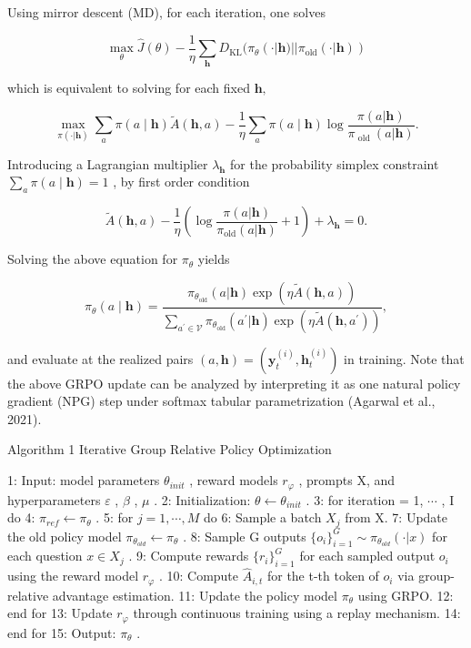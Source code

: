 \documentclass[
  10
]{article}
\begin{document}
Using mirror descent (MD), for each iteration, one solves

\[
\max _ {\theta} \hat {J} (\theta) - \frac {1}{\eta} \sum_ {\mathbf {h}} D _ {\mathrm{KL}} (\pi_ {\theta} (\cdot | \mathbf {h}) | | \pi_ {\mathrm{old}} (\cdot | \mathbf {h}))
\]

which is equivalent to solving for each fixed \(\mathbf { h } ,\)

\[
\max _ {\pi (\cdot | \mathbf {h})} \sum_ {a} \pi (a \mid \mathbf {h}) \tilde {A} (\mathbf {h}, a) - \frac {1}{\eta} \sum_ {a} \pi (a \mid \mathbf {h}) \log \frac {\pi (a | \mathbf {h})}{\pi_ {\text { old }} (a | \mathbf {h})}.
\]

Introducing a Lagrangian multiplier \(\lambda _ { \mathbf { h } }\) for
the probability simplex constraint
\(\scriptstyle \sum _ { a } \pi ( a \mid \mathbf { h } ) = 1\) , by
first order condition

\[
\tilde {A} (\mathbf {h}, a) - \frac {1}{\eta} \left(\log \frac {\pi (a | \mathbf {h})}{\pi_ {\mathrm{old}} (a | \mathbf {h})} + 1\right) + \lambda_ {\mathbf {h}} = 0.
\]

Solving the above equation for \(\pi _ { \theta }\) yields

\[
\pi_ {\theta} (a \mid \mathbf {h}) = \frac {\pi_ {\theta_ {\mathrm{old}}} (a | \mathbf {h}) \exp (\eta \tilde {A} (\mathbf {h} , a))}{\sum_ {a ^ {\prime} \in \mathcal {V}} \pi_ {\theta_ {\mathrm{old}}} (a ^ {\prime} | \mathbf {h}) \exp (\eta \tilde {A} (\mathbf {h} , a ^ {\prime}))},
\]

and evaluate at the realized pairs
\(( a , \mathbf { h } ) = ( \mathbf { y } _ { t } ^ { ( i ) } , \mathbf { h } _ { t } ^ { ( i ) } )\)
in training. Note that the above GRPO update can be analyzed by
interpreting it as one natural policy gradient (NPG) step under softmax
tabular parametrization (Agarwal et al., 2021).

Algorithm 1 Iterative Group Relative Policy Optimization

1: Input: model parameters \(\theta_{init}\) , reward models
\(r_{\varphi}\) , prompts X, and hyperparameters \(\varepsilon\) ,
\(\beta\) , \(\mu\) . 2: Initialization:
\(\theta \leftarrow \theta_{init}\) . 3: for iteration = 1, \(\cdots\) ,
I do 4: \(\pi_{ref} \leftarrow \pi_{\theta}\) . 5: for
\(j = 1, \cdots, M\) do 6: Sample a batch \(X_j\) from X. 7: Update the
old policy model \(\pi_{\theta_{old}} \leftarrow \pi_{\theta}\) . 8:
Sample G outputs \(\{o_i\}_{i=1}^G \sim \pi_{\theta_{old}}(\cdot | x)\)
for each question \(x \in X_j\) . 9: Compute rewards \(\{r_i\}_{i=1}^G\)
for each sampled output \(o_i\) using the reward model \(r_{\varphi}\) .
10: Compute \(\hat{A}_{i,t}\) for the t-th token of \(o_i\) via
group-relative advantage estimation. 11: Update the policy model
\(\pi_{\theta}\) using GRPO. 12: end for 13: Update \(r_{\varphi}\)
through continuous training using a replay mechanism. 14: end for 15:
Output: \(\pi_{\theta}\) .
\end{document}
